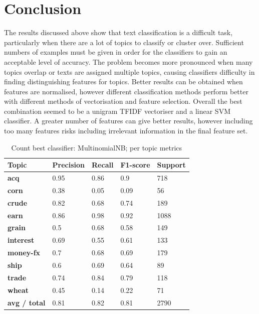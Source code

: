 \documentclass{article}
\begin{document}
\section{Conclusion}
The results discussed above show that text classification is a difficult task, particularly when there are a lot of topics to classify or cluster over. Sufficient numbers of examples must be given in order for the classifiers to gain an acceptable level of accuracy. The problem becomes more pronounced when many topics overlap or texts are assigned multiple topics, causing classifiers difficulty in finding distinguishing features for topics. Better results can be obtained when features are normalised, however different classification methods perform better with different methods of vectorisation and feature selection. Overall the best combination seemed to be a unigram TFIDF vectoriser and a linear SVM classifier. A greater number of features can give better results, however including too many features risks including irrelevant information in the final feature set.

\appendix

\clearpage

\begin{table}[H]
\begin{tabular}{l|llll}
\textbf{Topic}       & \textbf{Precision} & \textbf{Recall} & \textbf{F1-score} & \textbf{Support} \\ \hline
\textbf{acq}         & 0.95               & 0.86            & 0.9               & 718              \\
\textbf{corn}        & 0.38               & 0.05            & 0.09              & 56               \\
\textbf{crude}       & 0.82               & 0.68            & 0.74              & 189              \\
\textbf{earn}        & 0.86               & 0.98            & 0.92              & 1088             \\
\textbf{grain}       & 0.5                & 0.68            & 0.58              & 149              \\
\textbf{interest}    & 0.69               & 0.55            & 0.61              & 133              \\
\textbf{money-fx}    & 0.7                & 0.68            & 0.69              & 179              \\
\textbf{ship}        & 0.6                & 0.69            & 0.64              & 89               \\
\textbf{trade}       & 0.74               & 0.84            & 0.79              & 118              \\
\textbf{wheat}       & 0.45               & 0.14            & 0.22              & 71               \\
\textbf{avg / total} & 0.81               & 0.82            & 0.81              & 2790            
\end{tabular}
\caption {Count best classifier: MultinomialNB; per topic metrics}
\end{table}
\end{document}
